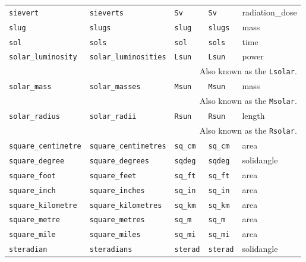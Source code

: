 \begin{landscape}
\begin{center}
\begin{longtable}{|lllll|}
{\tt\footnotesize sievert} & {\tt\footnotesize sieverts} & {\tt\footnotesize Sv} & {\tt\footnotesize Sv} & radiation\_dose \\
{\tt\footnotesize slug} & {\tt\footnotesize slugs} & {\tt\footnotesize slug} & {\tt\footnotesize slugs} & mass \\
{\tt\footnotesize sol} & {\tt\footnotesize sols} & {\tt\footnotesize sol} & {\tt\footnotesize sols} & time \\
{\tt\footnotesize solar\_luminosity} & {\tt\footnotesize solar\_luminosities} & {\tt\footnotesize Lsun} & {\tt\footnotesize Lsun} & power \\
\multicolumn{5}{|r|}{\footnotesize Also known as the {\tt Lsolar}.} \\
{\tt\footnotesize solar\_mass} & {\tt\footnotesize solar\_masses} & {\tt\footnotesize Msun} & {\tt\footnotesize Msun} & mass \\
\multicolumn{5}{|r|}{\footnotesize Also known as the {\tt Msolar}.} \\
{\tt\footnotesize solar\_radius} & {\tt\footnotesize solar\_radii} & {\tt\footnotesize Rsun} & {\tt\footnotesize Rsun} & length \\
\multicolumn{5}{|r|}{\footnotesize Also known as the {\tt Rsolar}.} \\
{\tt\footnotesize square\_centimetre} & {\tt\footnotesize square\_centimetres} & {\tt\footnotesize sq\_cm} & {\tt\footnotesize sq\_cm} & area \\
{\tt\footnotesize square\_degree} & {\tt\footnotesize square\_degrees} & {\tt\footnotesize sqdeg} & {\tt\footnotesize sqdeg} & solidangle \\
{\tt\footnotesize square\_foot} & {\tt\footnotesize square\_feet} & {\tt\footnotesize sq\_ft} & {\tt\footnotesize sq\_ft} & area \\
{\tt\footnotesize square\_inch} & {\tt\footnotesize square\_inches} & {\tt\footnotesize sq\_in} & {\tt\footnotesize sq\_in} & area \\
{\tt\footnotesize square\_kilometre} & {\tt\footnotesize square\_kilometres} & {\tt\footnotesize sq\_km} & {\tt\footnotesize sq\_km} & area \\
{\tt\footnotesize square\_metre} & {\tt\footnotesize square\_metres} & {\tt\footnotesize sq\_m} & {\tt\footnotesize sq\_m} & area \\
{\tt\footnotesize square\_mile} & {\tt\footnotesize square\_miles} & {\tt\footnotesize sq\_mi} & {\tt\footnotesize sq\_mi} & area \\
{\tt\footnotesize steradian} & {\tt\footnotesize steradians} & {\tt\footnotesize sterad} & {\tt\footnotesize sterad} & solidangle \\

\end{longtable}
\end{center}
\end{landscape}
